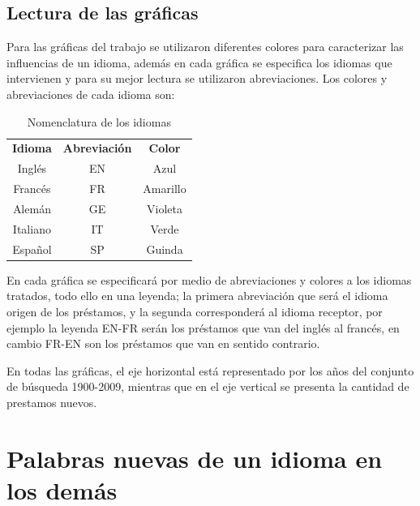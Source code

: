 \subsection*{Lectura de las gráficas} %

Para las gráficas del trabajo se utilizaron diferentes colores para
caracterizar las influencias de un idioma, además en cada gráfica se especifica
los idiomas que intervienen y para su mejor lectura se utilizaron
abreviaciones. Los colores y abreviaciones de cada idioma son:


\begin{table}[]
	\centering
	\begin{tabular}{ccc}
		\textbf{Idioma} & \textbf{Abreviación} & \textbf{Color} \\
		Inglés          & EN                   & Azul           \\
		Francés         & FR                   & Amarillo       \\
		Alemán          & GE                   & Violeta        \\
		Italiano        & IT                   & Verde          \\
		Español         & SP                   & Guinda        
	\end{tabular}
	\caption{Nomenclatura de los idiomas}
	\label{tab.idcolor}
\end{table}



En cada gráfica se especificará por medio de  abreviaciones y  colores a los
idiomas tratados, todo ello en una leyenda; la primera abreviación que será el
idioma origen de los préstamos, y la segunda corresponderá al idioma receptor,
por ejemplo  la leyenda EN-FR serán los préstamos que van del inglés al
francés, en cambio FR-EN son los préstamos que van en sentido contrario.

En todas las gráficas, el eje horizontal está representado por los años del
conjunto de búsqueda 1900-2009,  mientras que en el eje vertical se presenta la
cantidad de prestamos nuevos. 
\section{Palabras nuevas de un idioma en los demás} %

